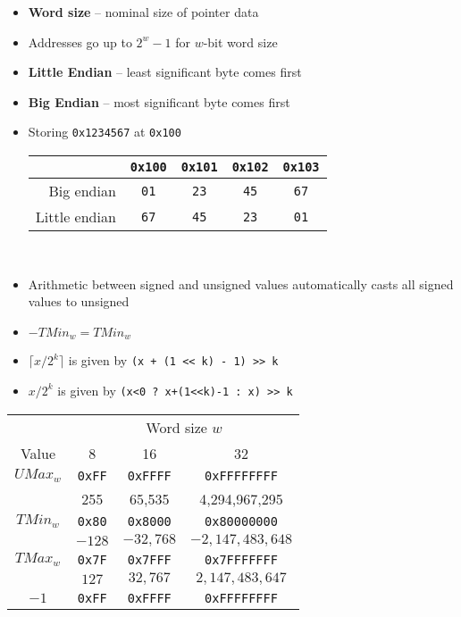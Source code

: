 \documentclass[twocolumn]{article}
\renewcommand{\tt}[1]{\texttt{#1}}
\begin{document}
\begin{itemize}[noitemsep]
    \item \textbf{Word size} -- nominal size of pointer data
    \item Addresses go up to $2^w - 1$ for $w$-bit word size
    \item \textbf{Little Endian} -- least significant byte comes first
    \item \textbf{Big Endian} -- most significant byte comes first
    \item Storing \tt{0x1234567} at \tt{0x100} \\
    \begin{tabular}{| r || c | c | c | c |}
        \hline
                      & \tt{0x100} & \tt{0x101} & \tt{0x102} & \tt{0x103} \\ \hline
        Big endian    & \tt{01}    & \tt{23}    & \tt{45}    & \tt{67}    \\ \hline
        Little endian & \tt{67}    & \tt{45}    & \tt{23}    & \tt{01}    \\ \hline
    \end{tabular} \\
    \item Arithmetic between signed and unsigned values automatically casts all signed values to unsigned
    \item $-TMin_w = TMin_w$
    \item $\lceil x/2^k \rceil$ is given by \tt{(x + (1 << k) - 1) >> k}
    \item $x/2^k$ is given by \tt{(x<0 ? x+(1<<k)-1 : x) >> k}
\end{itemize}

\begin{tabular}{| c || c | c | c |}
    \hline
    & \multicolumn{3}{c|}{Word size $w$} \\ \cline{2-4}
    Value & 8 & 16 & 32 \\ \hline
    $UMax_w$ & \tt{0xFF} & \tt{0xFFFF} & \tt{0xFFFFFFFF} \\
    & 255 & 65,535 & 4,294,967,295 \\ \hline
    $TMin_w$ & \tt{0x80} & \tt{0x8000} & \tt{0x80000000} \\
    & $-128$ & $-32,768$ & $-2,147,483,648$ \\ \hline
    $TMax_w$ & \tt{0x7F} & \tt{0x7FFF} & \tt{0x7FFFFFFF} \\
    & $127$ & $32,767$ & $2,147,483,647$ \\ \hline
    $-1$ & \tt{0xFF} & \tt{0xFFFF} & \tt{0xFFFFFFFF} \\ \hline
\end{tabular}
\end{document}
